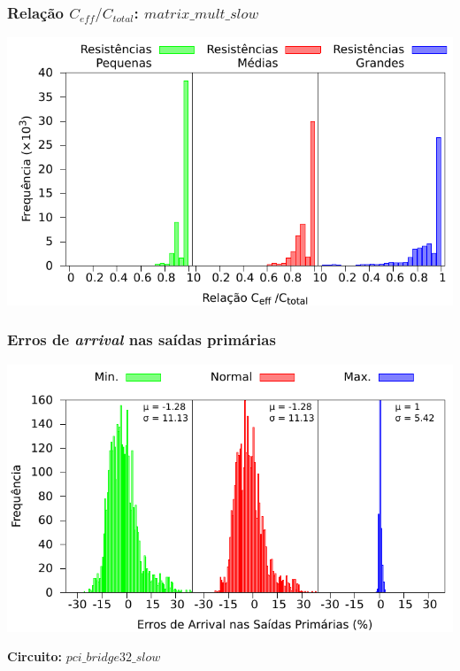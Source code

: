 \documentclass[10pt,a4paper]{beamer}
\begin{document}
		\begin{frame}
			\frametitle{Relação $C_{eff} / C_{total}$: $matrix\_mult\_slow$}
			\includegraphics[width=\linewidth]{img/experimentos/matrix_mult_resistance_full.pdf} 
		\end{frame}

		
		\begin{frame}
			\frametitle{Erros de \textit{arrival} nas saídas primárias}
			\begin{center}
				\includegraphics[width=0.9\linewidth]{img/arrival_error/pci_bridge32_puri.pdf}\\
			\end{center}
			\textbf{Circuito:} $pci\_bridge32\_slow$
		\end{frame}		
		
\end{document}
